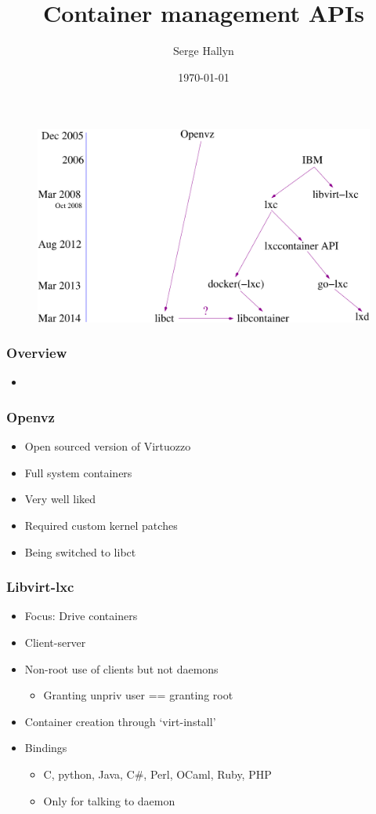 \documentclass{beamer}
\title[Linux Container APIs]{Container management APIs} %
\author{Serge Hallyn} %
\institute[Canonical] %
{
Canonical, Ltd \\ %
\medskip
\textit{serge.hallyn@ubuntu.com} %
}
\date{\today} %
\begin{document}
\begin{frame}
\titlepage %
\end{frame}

\begin{frame}
\begin{figure}
  \includegraphics[width=\textwidth]{timeline.pdf}
\end{figure}
\end{frame}

\begin{frame}
\frametitle{Overview}
\begin{itemize}
\item 
\end{itemize}
\end{frame}

\begin{frame}
\frametitle{Openvz}
\begin{itemize}
\item Open sourced version of Virtuozzo
\item Full system containers
\item Very well liked
\item Required custom kernel patches
\item Being switched to libct
\end{itemize}
\end{frame}

\begin{frame}
\frametitle{Libvirt-lxc}
\begin{itemize}
\item Focus: Drive containers
\item Client-server
\item Non-root use of clients but not daemons
  \begin{itemize}
  \item Granting unpriv user == granting root
  \end{itemize}
\item Container creation through `virt-install'
\item Bindings
  \begin{itemize}
  \item C, python, Java, C\#, Perl, OCaml, Ruby, PHP
  \item Only for talking to daemon
  \end{itemize}
\end{itemize}
\end{frame}
\end{document}
